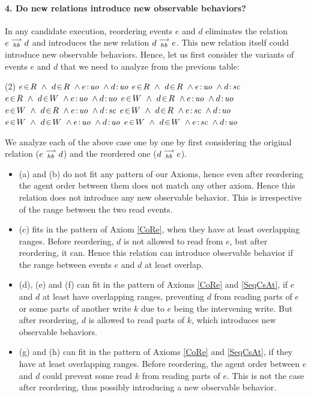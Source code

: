 
\paragraph{4. Do new relations introduce new observable behaviors?}
    In any candidate execution, reordering events $e$ and $d$ eliminates the relation $e\stackrel{\longrightarrow}{_{hb}}d$ and introduces the new relation $d\stackrel{\longrightarrow}{_{hb}}e$.
    This new relation itself could introduce new observable behaviors.  
    Hence, let us first consider the variants of events $e$ and $d$ that we need to analyze from the previous table:
    \begin{tasks}(2)
        \task $\event{e}{R} \ \wedge \ \event{d}{R} \ \wedge \et{e}{uo} \ \wedge \et{d}{uo}$
        \task $\event{e}{R} \ \wedge \ \event{d}{R} \ \wedge \et{e}{uo} \ \wedge \et{d}{sc}$
        \task $\event{e}{R} \ \wedge \ \event{d}{W} \ \wedge \et{e}{uo} \ \wedge \et{d}{uo}$
        \task $\event{e}{W} \ \wedge \ \event{d}{R} \ \wedge \et{e}{uo} \ \wedge \et{d}{uo}$
        \task $\event{e}{W} \ \wedge \ \event{d}{R} \ \wedge \et{e}{uo} \ \wedge \et{d}{sc}$
        \task $\event{e}{W} \ \wedge \ \event{d}{R} \ \wedge \et{e}{sc} \ \wedge \et{d}{uo}$
        \task $\event{e}{W} \ \wedge \ \event{d}{W} \ \wedge \et{e}{uo} \ \wedge \et{d}{uo}$
        \task $\event{e}{W} \ \wedge \ \event{d}{W} \ \wedge \et{e}{sc} \ \wedge \et{d}{uo}$
    \end{tasks}

    We analyze each of the above case one by one by first considering the original relation ($e\stackrel{\longrightarrow}{_{hb}}d$) and the reordered one ($d\stackrel{\longrightarrow}{_{hb}}e$). 
    \begin{itemize}
        \item (a) and (b) do not fit any pattern of our Axioms, hence even after reordering the agent order between them does not match any other axiom. Hence this relation does not introduce any new observable behavior. This is irrespective of the range between the two read events.
        \item (c) fits in the pattern of Axiom \ref{CoRe}, when they have at least overlapping ranges. Before reordering, $d$ is not allowed to read from $e$, but after reordering, it can. Hence this relation can introduce observable behavior if the range between events $e$ and $d$ at least overlap. 
        \item (d), (e) and (f) can fit in the pattern of Axioms \ref{CoRe} and \ref{SeqCsAt}, if $e$ and $d$ at least have overlapping ranges, preventing $d$ from reading parts of $e$ or some parts of another write $k$ due to $e$ being the intervening write. But after reordering, $d$ is allowed to read parts of $k$, which introduces new observable behaviors.
        \item (g) and (h) can fit in the pattern of Axioms \ref{CoRe} and \ref{SeqCsAt}, if they have at least overlapping ranges. Before reordering, the agent order between $e$ and $d$ could prevent some read $k$ from reading parts of $e$. This is not the case after reordering, thus possibly introducing a new observable behavior. 
    \end{itemize}

